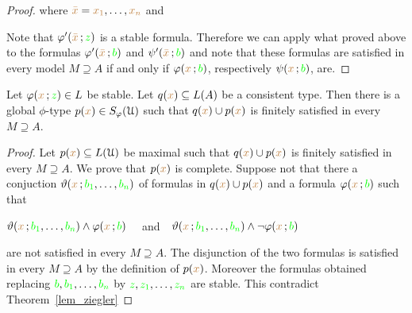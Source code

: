 \documentclass[creche.tex]{subfiles}
\begin{document}
\begin{proof}

  where ${\color{brown}\bar x}={\color{brown} x_1},\dots,{\color{brown} x_n}$ and 



  Note that $\varphi'({\color{brown}\bar x}\,;{\color{green} z})$ is a stable formula.
  Therefore we can apply what proved above to the formulas $\varphi'({\color{brown}\bar x}\,;{\color{green} b})$ and $\psi'({\color{brown}\bar x}\,;{\color{green} b})$ and note that these formulas are satisfied in every model $M\supseteq A$ if and only if $\varphi({\color{brown} x}\,;{\color{green} b})$, respectively $\psi({\color{brown} x}\,;{\color{green} b})$, are.
\end{proof}

\begin{corollary}\label{corol_stable_coheir_over_models}
  Let $\varphi({\color{brown} x}\,;{\color{green} z})\in L$ be stable.
  Let $q({\color{brown} x})\subseteq L(A)$ be a consistent type.
  Then there is a global $\phi$-type $p({\color{brown} x})\in S_{\varphi}(\EuScript U)$ such that $q({\color{brown} x})\cup p({\color{brown} x})$ is finitely satisfied in every $M\supseteq A$.
\end{corollary}

\begin{proof}
  Let $p({\color{brown} x})\subseteq L(\EuScript U)$ be maximal such that $q({\color{brown} x})\cup p({\color{brown} x})$ is finitely satisfied in every $M\supseteq A$.
  We prove that $p({\color{brown} x})$ is complete.
  Suppose not that there a conjuction $\vartheta({\color{brown} x}\,;{\color{green} b_1},\dots,{\color{green} b_n})$ of formulas in $q({\color{brown} x})\cup p({\color{brown} x})$ and a formula $\varphi({\color{brown} x}\,;{\color{green} b})$ such that 

  \hfil$\vartheta({\color{brown} x}\,;{\color{green} b_1},\dots,{\color{green} b_n})\wedge\varphi({\color{brown} x}\,;{\color{green} b})$ \ \ and\ \   $\vartheta({\color{brown} x}\,;{\color{green} b_1},\dots,{\color{green} b_n})\wedge\neg\varphi({\color{brown} x}\,;{\color{green} b})$ 
 
  are not satisfied in every $M\supseteq A$.
  The disjunction of the two formulas is satisfied in every $M\supseteq A$ by the definition of $p({\color{brown} x})$.
  Moreover the formulas obtained replacing ${\color{green} b},{\color{green} b_1},\dots,{\color{green} b_n}$ by ${\color{green} z},{\color{green} z_1},\dots,{\color{green} z_n}$ are stable.
  This contradict Theorem~\ref{lem_ziegler}
\end{proof}
\end{document}
